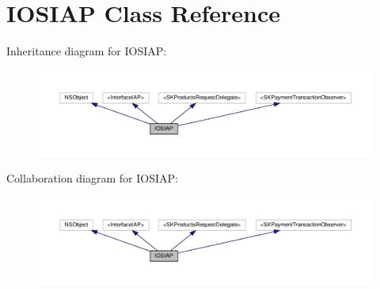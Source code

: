 \hypertarget{interfaceIOSIAP}{}\section{I\+O\+S\+I\+AP Class Reference}
\label{interfaceIOSIAP}


Inheritance diagram for I\+O\+S\+I\+AP\+:
\nopagebreak
\begin{figure}[H]
\begin{center}
\leavevmode
\includegraphics[width=350pt]{interfaceIOSIAP__inherit__graph}
\end{center}
\end{figure}


Collaboration diagram for I\+O\+S\+I\+AP\+:
\nopagebreak
\begin{figure}[H]
\begin{center}
\leavevmode
\includegraphics[width=350pt]{interfaceIOSIAP__coll__graph}
\end{center}
\end{figure}
